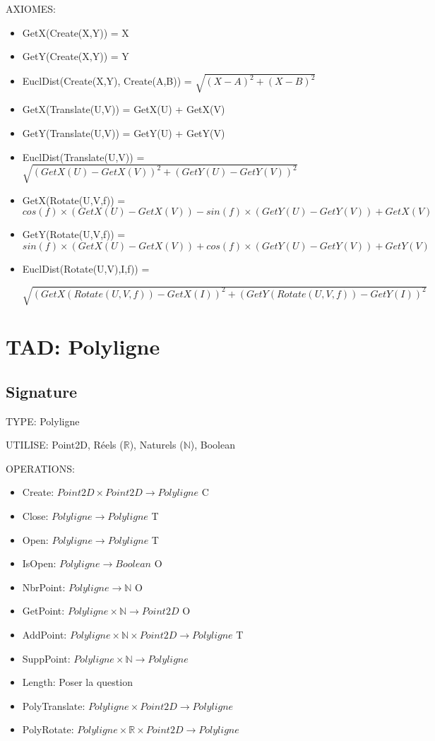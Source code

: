 \documentclass[a4paper, 11pt, oneside]{article}
\begin{document}
\noindent AXIOMES: 
\begin{itemize}
    \item GetX(Create(X,Y)) = X
    \item GetY(Create(X,Y)) = Y
    \item EuclDist(Create(X,Y), Create(A,B)) = $\sqrt{{(X-A)}^{2}+{(X-B)}^{2}}$
    \item GetX(Translate(U,V)) = GetX(U) + GetX(V)
    \item GetY(Translate(U,V)) = GetY(U) + GetY(V)
    \item EuclDist(Translate(U,V)) = $\sqrt{{(GetX(U)-GetX(V))}^{2}+{(GetY(U)-GetY(V))}^{2}}$
    \item GetX(Rotate(U,V,f)) = $cos(f) \times (GetX(U)-GetX(V)) - sin(f) \times (GetY(U)-GetY(V)) + GetX(V) $ 
    \item GetY(Rotate(U,V,f)) = $sin(f) \times (GetX(U)-GetX(V)) + cos(f) \times (GetY(U)-GetY(V)) + GetY(V) $ 
    \item EuclDist(Rotate(U,V),I,f)) =
    
    $\sqrt{{(GetX(Rotate(U,V,f))-GetX(I))}^{2}+{(GetY(Rotate(U,V,f))-GetY(I))}^{2}}$
\end{itemize}


\section{TAD: Polyligne}

\subsection{Signature}

\noindent TYPE: Polyligne

\noindent UTILISE: Point2D, Réels ($\mathbb{R}$), Naturels ($\mathbb{N}$), Boolean


\noindent OPERATIONS: 
\begin{itemize}
    \item Create: $Point2D \times Point2D \xrightarrow{} Polyligne$ {\color{green} C}
    \item Close: $Polyligne \xrightarrow{} Polyligne$ {\color{green} T}
    \item Open: $Polyligne \xrightarrow{} Polyligne$ {\color{green} T}
    \item IsOpen: $Polyligne \xrightarrow{} Boolean$ {\color{green} O}
    \item NbrPoint: $Polyligne \xrightarrow{} \mathbb{N}$ {\color{green} O}
    \item GetPoint: $Polyligne \times \mathbb{N} \xrightarrow{} Point2D$ {\color{green} O}
    \item AddPoint: $Polyligne \times \mathbb{N} \times Point2D \xrightarrow{} Polyligne${\color{green} T}
    \item SuppPoint: $Polyligne \times \mathbb{N} \xrightarrow{} Polyligne$
    \item Length: {\color{red} Poser la question }
    \item PolyTranslate: $Polyligne \times Point2D \xrightarrow{} Polyligne$
    \item PolyRotate: $Polyligne \times \mathbb{R} \times Point2D \xrightarrow{} Polyligne$
\end{itemize}
\end{document}
